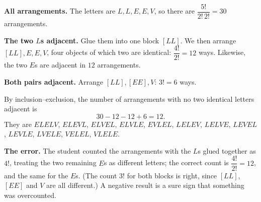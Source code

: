 \textbf{All arrangements.} The letters are $L,L,E,E,V$, so there are $\dfrac{5!}{2!\,2!}=30$ arrangements.

\textbf{The two $L$s adjacent.} Glue them into one block $[LL]$. We then arrange $[LL],E,E,V$, four objects of which two are identical: $\dfrac{4!}{2!}=12$ ways. Likewise, the two $E$s are adjacent in $12$ arrangements.

\textbf{Both pairs adjacent.} Arrange $[LL],[EE],V$: $3!=6$ ways.

By inclusion--exclusion, the number of arrangements with no two identical letters adjacent is
\[30-12-12+6=\boxed{12}.\]
They are $ELELV$, $ELEVL$, $ELVEL$, $ELVLE$, $EVLEL$, $LELEV$, $LELVE$, $LEVEL$, $LEVLE$, $LVELE$, $VELEL$, $VLELE$.

\textbf{The error.} The student counted the arrangements with the $L$s glued together as $4!$, treating the two remaining $E$s as different letters; the correct count is $\dfrac{4!}{2!}=12$, and the same for the $E$s. (The count $3!$ for both blocks is right, since $[LL]$, $[EE]$ and $V$ are all different.) A negative result is a sure sign that something was overcounted.
